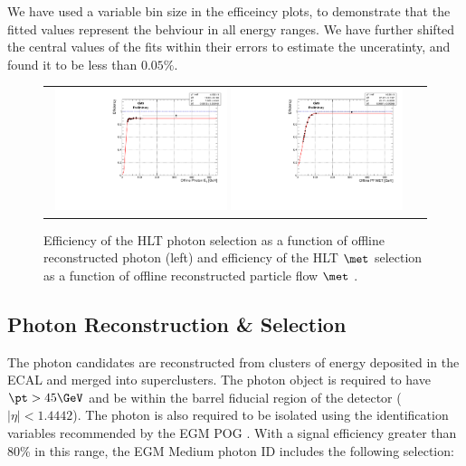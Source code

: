 We have used a variable bin size in the efficeincy plots, to demonstrate that the fitted values represent the behviour in all energy ranges. We have further shifted the central values of the fits within their errors to estimate the unceratinty, and found it to be less than $0.05 \%$.

\begin{figure}[htb]
  \begin{center}
    \begin{tabular}{cc}
    \includegraphics[width=0.48\textwidth]{analysis_figs/eff_id_vspt.pdf}
    \includegraphics[width=0.48\textwidth]{analysis_figs/eff_met.pdf}
    \end{tabular}
    \caption{Efficiency of the HLT photon selection as a function of offline reconstructed photon \pt (left) and efficiency of the HLT $\met$ selection as a function of offline reconstructed particle flow $\met$ .}
    \label{fig:hlteff}
  \end{center}
\end{figure}

\subsection{Photon Reconstruction \& Selection}
\label{sec:photonid}
The photon candidates are reconstructed from clusters of energy deposited in the ECAL and merged into superclusters. The photon object is required to have $\pt > 45 \GeV$ and be within the barrel fiducial region of the detector ($|\eta | < 1.4442$). The photon is also required to be isolated using the identification variables recommended by the EGM POG \cite{PhotonID}. With a signal efficiency greater than 80\% in this range, the EGM Medium photon ID includes the following selection:

